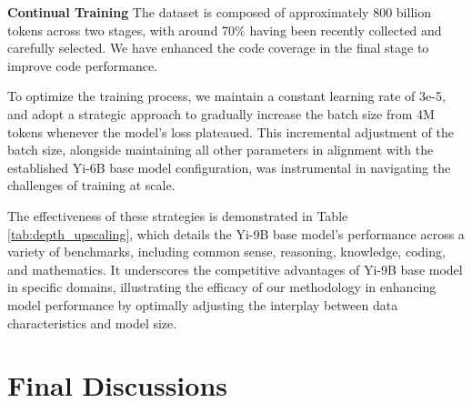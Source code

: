 \documentclass[numbers,sort&compress]{article}
\begin{document}
\begin{table}[tb!]
\centering
{}
\caption{Performance between Yi-6B and Yi-9B: Arc Challenge (25-shot), HellaSwag (10-shot) MMLU (5-shot), Winogrande (5-shot), GSM8K (5-shot), MATH (4-shot), HumanEval pass@1, MBPP pass@1(3-shot). Yi-9B Init is just depthwise upscaling from Yi-6B by duplicating layers 12-28 without further training.}
\label{tab:depth_upscaling}
\end{table}

\textbf{Continual Training}\quad
The dataset is composed of approximately 800 billion tokens across two stages, with around 70\% having been recently collected and carefully selected. We have enhanced the code coverage in the final stage to improve code performance.

To optimize the training process, we maintain a constant learning rate of 3e-5, and adopt a strategic approach to gradually increase the batch size from 4M tokens whenever the model's loss plateaued. This incremental adjustment of the batch size, alongside maintaining all other parameters in alignment with the established Yi-6B base model configuration, was instrumental in navigating the challenges of training at scale.

The effectiveness of these strategies is demonstrated in Table \ref{tab:depth_upscaling}, which details the Yi-9B base model's performance across a variety of benchmarks, including common sense, reasoning, knowledge, coding, and mathematics. It underscores the competitive advantages of Yi-9B base model in specific domains, illustrating the efficacy of our methodology in enhancing model performance by optimally adjusting the interplay between data characteristics and model size.

\section{Final Discussions}
\label{sec:conclusion}
\end{document}
